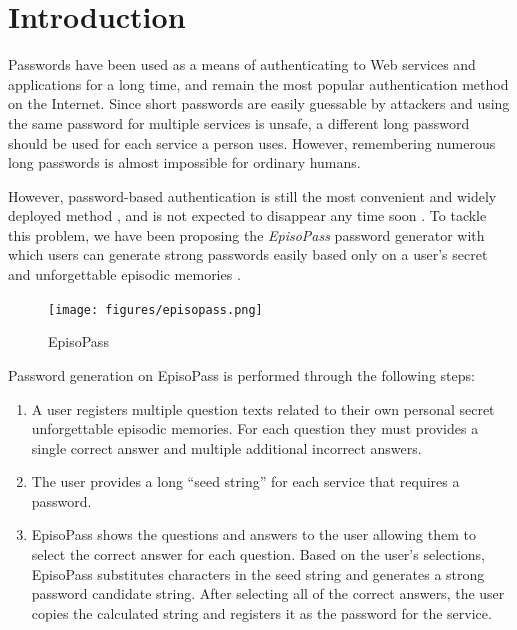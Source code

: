 \documentclass[sigconf]{acmart}
\begin{document}
\section{Introduction}

Passwords have been used as a means of authenticating to Web services
and applications for a long time, and remain the most popular
authentication method on the Internet.
Since short passwords are easily guessable by attackers and using the
same password for multiple services is unsafe, a different long
password should be used for each service a person uses.
However, remembering numerous long passwords is almost impossible for
ordinary humans.

However, password-based authentication is still the most convenient
and widely deployed method \cite{Bonneau:ReplacePasswords}, and is not
expected to disappear any time soon \cite{Herley:2009:PSS:1601990.1602010}.
%
To tackle this problem,
we have been proposing the \textit{EpisoPass} password generator with which 
users can generate strong passwords easily
based only on a user's secret and unforgettable episodic memories \cite{Masui:EpisoPass}.


\begin{figure}[H]
  \centerline{\texttt{[image: figures/episopass.png]}}
  \caption{EpisoPass}
  \label{EpisoPass}
\end{figure}

Password generation on EpisoPass is performed through the following steps:

\begin{enumerate}
\item A user registers multiple question texts related to their own personal
secret unforgettable episodic memories. For each question they must provides
a single correct answer and multiple additional incorrect answers.

\item The user provides a long ``seed string'' for each service that requires
a password.

\item EpisoPass shows the questions and answers to the user allowing
them to select the correct answer for each question.
Based on the user's selections,
EpisoPass substitutes characters in the seed string and generates a
strong password candidate string.
After selecting all of the correct answers,
the user copies the calculated string
and registers it as the password for the service.
\end{enumerate}
\end{document}
